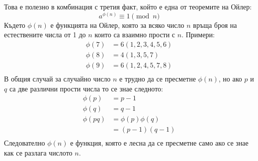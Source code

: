   Това е полезно в комбинация с третия факт, който е една от теоремите на Ойлер:
  \begin{equation}
    a^{\phi(n)} \equiv 1 \pmod{n}
    \label{rsa-euler-theorem}
  \end{equation}
  Където $\phi(n)$ е функцията на Ойлер, която за всяко число $n$ връща броя на естествените числа от 1 до $n$ които са взаимно прости с $n$. Примери:
  \begin{equation}
    \begin{split}
      \phi(7) &= 6 (1,2,3,4,5,6) \\
      \phi(8) &= 4 (1,3,5,7) \\
      \phi(9) &= 6 (1,2,4,5,7,8) \\
    \end{split}
    \label{rsa-euler-function}
  \end{equation}
  В общия случай за случайно число $n$ е трудно да се пресметне $\phi(n)$, но ако $p$ и $q$ са две различни прости числа то се знае следното:
  \begin{equation}
    \begin{split}
      \phi(p) &= p-1 \\
      \phi(q) &= q-1 \\
      \phi(pq) &= \phi(p)\phi(q) \\
      &= (p-1)(q-1) \\
    \end{split}
    \label{rsa-phi-calculation}
  \end{equation}
  Следователно $\phi(n)$ е функция, която е лесна да се пресметне само ако се знае как се разлага числото $n$.

